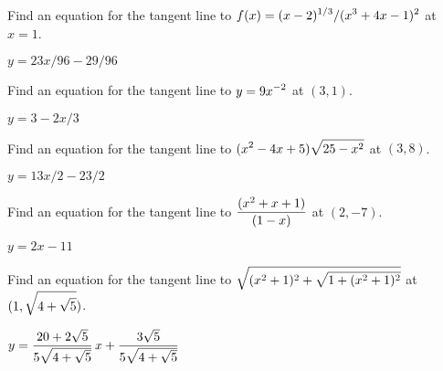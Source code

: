 \begin{exercises}
\endtwocol
\bsk

\exercise  Find an equation for the tangent line to 
$\displaystyle f(x) = (x-2)^{1/3}/(x^3 + 4x - 1)^2$ at $x=1$.
\begin{answer} $y=23x/96-29/96$
\end{answer}

\exercise Find an equation for the tangent line to $\displaystyle y=9x^{-2}$ at $(3,1)$.
\begin{answer} $y=3-2x/3$
\end{answer}

\exercise Find an equation for the tangent line to $\displaystyle (x^2-4x+5)\sqrt{25-x^2}$ 
at $(3,8)$.
\begin{answer} $y=13x/2-23/2$
\end{answer}

\exercise Find an equation for the tangent line to $\displaystyle \displaystyle{(x^2+x+1)\over(1-x)}$ 
at $(2,-7)$.
\begin{answer} $y=2x-11$
\end{answer}

\exercise Find an equation for the tangent line to 
$\displaystyle \sqrt{(x^2+1)^2+\sqrt{1+(x^2+1)^2}}$
at $\displaystyle (1,\sqrt{4+\sqrt{5}})$.
\begin{answer} $\displaystyle y=
{20+2\sqrt5\over5\sqrt{4+\sqrt5}}\,x+{3\sqrt5\over5\sqrt{4+\sqrt5}}$
\end{answer}

\end{exercises}
